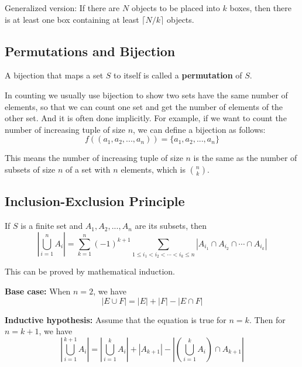 \documentclass[a4paper,12pt]{article}
\begin{document}
Generalized version:
If there are $N$ objects to be placed into $k$ boxes, then there is at least one box containing at least $\lceil N/k \rceil$ objects.

\subsection{Permutations and Bijection}

A bijection that maps a set $S$ to itself is called a \textbf{permutation} of $S$.

In counting we usually use bijection to show two sets have the same number of elements, so that we can count one set and get the number of elements of the other set.
And it is often done implicitly.
For example, if we want to count the number of increasing tuple of size $n$, we can define a bijection as follows:
\begin{equation*}
	f((a_1, a_2, ..., a_n)) = \{a_1, a_2, ..., a_n\}
\end{equation*}

This means the number of increasing tuple of size $n$ is the same as the number of subsets of size $n$ of a set with $n$ elements, which is $\binom{n}{k}$.

\subsection{Inclusion-Exclusion Principle}

If $S$ is a finite set and $A_1, A_2, ..., A_n$ are its subsets, then
\begin{equation*}
	\left| \bigcup_{i=1}^{n} A_i \right| = \sum_{k=1}^{n} (-1)^{k+1} \sum_{1 \leq i_1 < i_2 < \cdots < i_k \leq n} \left| A_{i_1} \cap A_{i_2} \cap \cdots \cap A_{i_k} \right|
\end{equation*}

This can be proved by mathematical induction.

\textbf{Base case:}
When $n = 2$, we have
\begin{equation*}
	|E \cup F| = |E| + |F| - |E \cap F|
\end{equation*}

\textbf{Inductive hypothesis:}
Assume that the equation is true for $n = k$.
Then for $n = k+1$, we have
\begin{equation*}
	\left| \bigcup_{i=1}^{k+1} A_i \right| = \left| \bigcup_{i=1}^{k} A_i \right| + \left| A_{k+1} \right| - \left| \left( \bigcup_{i=1}^{k} A_i \right) \cap A_{k+1} \right|
\end{equation*}
\end{document}
